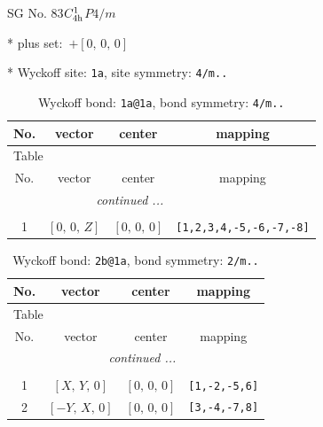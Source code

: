 \documentclass[fleqn,8pt]{jsarticle}
\begin{document}
\setcounter{MaxMatrixCols}{32}

\renewcommand{\tablename}{Table~}
\renewcommand{\figurename}{Figure~}
\begin{center}
\LARGE
SG No. 83\quad$C_{\rm 4h}^{1}$\quad$P4/m$\quad[ tetragonal ]
\end{center}

* plus set:\,\,\,$+\left[ 0,\, 0,\, 0 \right]$


* Wyckoff site: {\tt 1a}, site symmetry: {\tt 4/m..}
\renewcommand{\arraystretch}{1.2}
\begin{longtable}{cccc}
\caption{Wyckoff bond: {\tt 1a@1a}, bond symmetry: {\tt 4/m..}}
 \\
 \hline \hline
No. & vector & center & mapping \\ \hline \endfirsthead

\multicolumn{3}{l}{\tablename\ \thetable{}} \\
 \hline \hline
No. & vector & center & mapping \\ \hline \endhead

 \hline \hline
\multicolumn{3}{r}{\footnotesize\it continued ...} \\ \endfoot

 \hline \hline
\multicolumn{3}{r}{} \\ \endlastfoot

1 & $\left[ 0,\, 0,\, Z \right]$ & $\left[ 0,\, 0,\, 0 \right]$ & {\tt [1,2,3,4,-5,-6,-7,-8]} \\
\end{longtable}
\renewcommand{\arraystretch}{1.2}
\begin{longtable}{cccc}
\caption{Wyckoff bond: {\tt 2b@1a}, bond symmetry: {\tt 2/m..}}
 \\
 \hline \hline
No. & vector & center & mapping \\ \hline \endfirsthead

\multicolumn{3}{l}{\tablename\ \thetable{}} \\
 \hline \hline
No. & vector & center & mapping \\ \hline \endhead

 \hline \hline
\multicolumn{3}{r}{\footnotesize\it continued ...} \\ \endfoot

 \hline \hline
\multicolumn{3}{r}{} \\ \endlastfoot

1 & $\left[ X,\, Y,\, 0 \right]$ & $\left[ 0,\, 0,\, 0 \right]$ & {\tt [1,-2,-5,6]} \\ \hline
2 & $\left[ - Y,\, X,\, 0 \right]$ & $\left[ 0,\, 0,\, 0 \right]$ & {\tt [3,-4,-7,8]} \\
\end{longtable}
\end{document}
